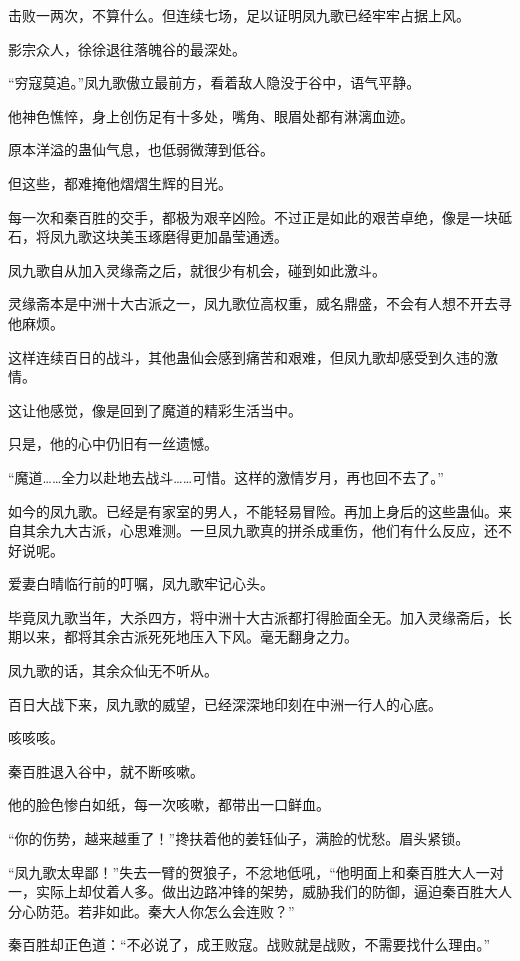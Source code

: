 \begin{this_body}
击败一两次，不算什么。但连续七场，足以证明凤九歌已经牢牢占据上风。

影宗众人，徐徐退往落魄谷的最深处。

“穷寇莫追。”凤九歌傲立最前方，看着敌人隐没于谷中，语气平静。

他神色憔悴，身上创伤足有十多处，嘴角、眼眉处都有淋漓血迹。

原本洋溢的蛊仙气息，也低弱微薄到低谷。

但这些，都难掩他熠熠生辉的目光。

每一次和秦百胜的交手，都极为艰辛凶险。不过正是如此的艰苦卓绝，像是一块砥石，将凤九歌这块美玉琢磨得更加晶莹通透。

凤九歌自从加入灵缘斋之后，就很少有机会，碰到如此激斗。

灵缘斋本是中洲十大古派之一，凤九歌位高权重，威名鼎盛，不会有人想不开去寻他麻烦。

这样连续百日的战斗，其他蛊仙会感到痛苦和艰难，但凤九歌却感受到久违的激情。

这让他感觉，像是回到了魔道的精彩生活当中。

只是，他的心中仍旧有一丝遗憾。

“魔道……全力以赴地去战斗……可惜。这样的激情岁月，再也回不去了。”

如今的凤九歌。已经是有家室的男人，不能轻易冒险。再加上身后的这些蛊仙。来自其余九大古派，心思难测。一旦凤九歌真的拼杀成重伤，他们有什么反应，还不好说呢。

爱妻白晴临行前的叮嘱，凤九歌牢记心头。

毕竟凤九歌当年，大杀四方，将中洲十大古派都打得脸面全无。加入灵缘斋后，长期以来，都将其余古派死死地压入下风。毫无翻身之力。

凤九歌的话，其余众仙无不听从。

百日大战下来，凤九歌的威望，已经深深地印刻在中洲一行人的心底。

咳咳咳。

秦百胜退入谷中，就不断咳嗽。

他的脸色惨白如纸，每一次咳嗽，都带出一口鲜血。

“你的伤势，越来越重了！”搀扶着他的姜钰仙子，满脸的忧愁。眉头紧锁。

“凤九歌太卑鄙！”失去一臂的贺狼子，不忿地低吼，“他明面上和秦百胜大人一对一，实际上却仗着人多。做出边路冲锋的架势，威胁我们的防御，逼迫秦百胜大人分心防范。若非如此。秦大人你怎么会连败？”

秦百胜却正色道：“不必说了，成王败寇。战败就是战败，不需要找什么理由。”


\end{this_body}
